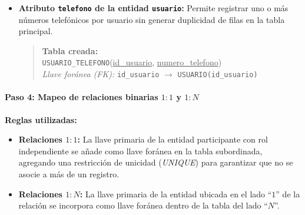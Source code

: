 \begin{itemize}
    \item \textbf{Atributo \texttt{telefono} de la entidad \texttt{usuario}:} Permite registrar uno o más números telefónicos por usuario sin generar duplicidad de filas en la tabla principal.
    \begin{quote}
        \textbf{Tabla creada:} \\
        \texttt{USUARIO\_TELEFONO}(\underline{id\_usuario}, \underline{numero\_telefono}) \\
        \textit{Llave foránea (FK):} \texttt{id\_usuario} $\rightarrow$ \texttt{USUARIO(id\_usuario)}
    \end{quote}
\end{itemize}

\paragraph{Paso 4: Mapeo de relaciones binarias $1:1$ y $1:N$}
\textbf{Reglas utilizadas:}
\begin{itemize}
    \item \textbf{Relaciones $1:1$:} La llave primaria de la entidad participante con rol independiente se añade como llave foránea en la tabla subordinada, agregando una restricción de unicidad (\textit{UNIQUE}) para garantizar que no se asocie a más de un registro.
    \item \textbf{Relaciones $1:N$:} La llave primaria de la entidad ubicada en el lado ``$1$'' de la relación se incorpora como llave foránea dentro de la tabla del lado ``$N$''.
\end{itemize}

